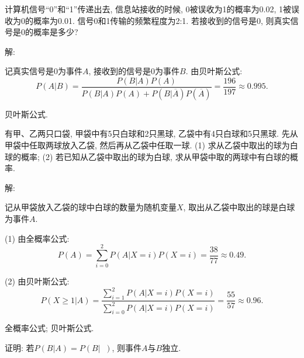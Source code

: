 \documentclass[standard]{ExBook}
\begin{document}
\begin{qitems}
    \begin{bbox}
    \begin{shaded}
        \qitem
计算机信号“0”和“1”传递出去, 信息站接收的时候, 0被误收为1的概率为0.02, 1被误收为0的概率为0.01. 信号0和1传输的频繁程度为2:1. 若接收到的信号是0, 则真实信号是0的概率是多少?
    \end{shaded}
    \end{bbox}

\vspace{-5em}

    \begin{bbox}
解: 

记真实信号是0为事件$A$, 接收到的信号是0为事件$B$. 由贝叶斯公式:
$$P(A|B)=\frac{P(B|A)P(A)}{P(B|A)P(A)+P(B|\overline{A})P(\overline{A})}=\frac{196}{197}\approx0.995.$$

\textcolor{themeColor}{\selectfont {} 贝叶斯公式.}
    \end{bbox}

\vspace{-5em}

    \begin{bbox}
    \begin{shaded}
        \qitem
有甲、乙两只口袋, 甲袋中有5只白球和2只黑球, 乙袋中有4只白球和5只黑球. 先从甲袋中任取两球放入乙袋, 然后再从乙袋中任取一球.
(1) 求从乙袋中取出的球为白球的概率;
(2) 若已知从乙袋中取出的球为白球, 求从甲袋中取的两球中有白球的概率.
    \end{shaded}
    \end{bbox}

\vspace{-5em}

    \begin{bbox}
解:

记从甲袋放入乙袋的球中白球的数量为随机变量$X$, 取出从乙袋中取出的球是白球为事件$A$.

(1) 由全概率公式:
$$P(A)=\sum\limits_{i=0}^{2}P(A|X=i)P(X=i)=\frac{38}{77}\approx0.49.$$

(2) 由贝叶斯公式:
$$P(X\geq1|A)=\frac{\sum\limits_{i=1}^{2}P(A|X=i)P(X=i)}{\sum\limits_{i=0}^{2}P(A|X=i)P(X=i)}=\frac{55}{57}\approx0.96.$$

\textcolor{themeColor}{\selectfont {} 全概率公式; 贝叶斯公式.}
    \end{bbox}

\vspace{-5em}

    \begin{bbox}
    \begin{shaded}
        \qitem
证明: 若$P(B|A) = P(B|\mathop{\overline{A}})$, 则事件$A$与$B$独立.
    \end{shaded}
    \end{bbox}


\end{qitems}
\end{document}
